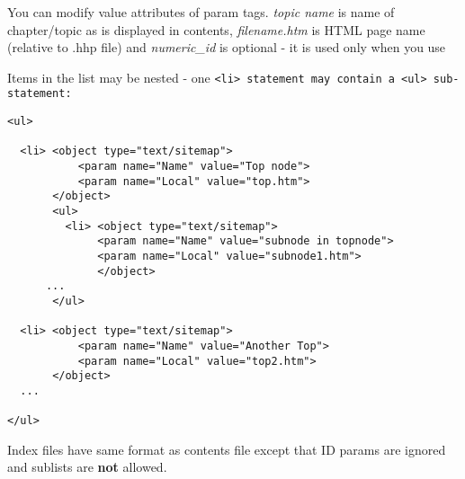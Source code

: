 You can modify value attributes of param tags. {\it topic name} is name of chapter/topic as is displayed in
contents, {\it filename.htm} is HTML page name (relative to .hhp file) and {\it numeric\_id} is optional 
- it is used only when you use 

Items in the list may be nested - one \tt{<li>} statement may contain a \tt{<ul>} sub-statement:

\begin{verbatim}
<ul>

  <li> <object type="text/sitemap">
           <param name="Name" value="Top node">
           <param name="Local" value="top.htm">
       </object>
       <ul>
         <li> <object type="text/sitemap">
              <param name="Name" value="subnode in topnode">
              <param name="Local" value="subnode1.htm">
              </object>
      ...
       </ul>
       
  <li> <object type="text/sitemap">
           <param name="Name" value="Another Top">
           <param name="Local" value="top2.htm">
       </object>
  ...    

</ul>
\end{verbatim}


Index files have same format as contents file except that ID params are ignored and sublists are {\bf not} 
allowed.

